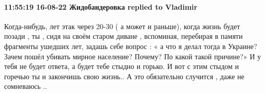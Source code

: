  
 
 
 
 

\paragraph{11:55:19 16-08-22 Жидобандеровка replied to Vladimir}

\obeycr
Когда-нибудь, лет этак через 20-30 ( а может и раньше), когда жизнь будет позади , ты , сидя на своём старом диване , вспоминая, перебирая в памяти фрагменты ушедших лет, задашь себе вопрос : « а что я делал тогда в Украине? Зачем пошёл убивать мирное население? Почему? По какой такой причине?»
И у тебя не будет ответа, а будет тебе стыдно и горько. И вот с этим стыдом и горечью ты и закончишь свою жизнь..
А это обязательно случится , даже не сомневаюсь ..
\restorecr
